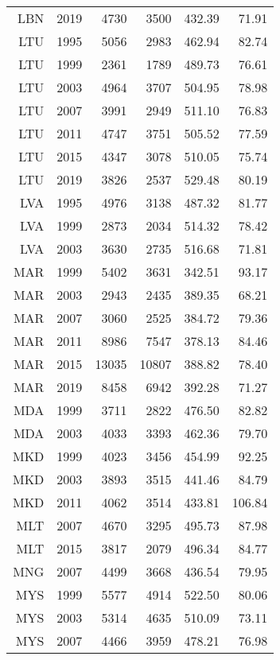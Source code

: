 \begin{longtable}{|r|r|r|r|r|r|}
    LBN   & 2019  & 4730  & 3500  & 432.39 & 71.91 \\
    LTU   & 1995  & 5056  & 2983  & 462.94 & 82.74 \\
    LTU   & 1999  & 2361  & 1789  & 489.73 & 76.61 \\
    LTU   & 2003  & 4964  & 3707  & 504.95 & 78.98 \\
    LTU   & 2007  & 3991  & 2949  & 511.10 & 76.83 \\
    LTU   & 2011  & 4747  & 3751  & 505.52 & 77.59 \\
    LTU   & 2015  & 4347  & 3078  & 510.05 & 75.74 \\
    LTU   & 2019  & 3826  & 2537  & 529.48 & 80.19 \\
    LVA   & 1995  & 4976  & 3138  & 487.32 & 81.77 \\
    LVA   & 1999  & 2873  & 2034  & 514.32 & 78.42 \\
    LVA   & 2003  & 3630  & 2735  & 516.68 & 71.81 \\
    MAR   & 1999  & 5402  & 3631  & 342.51 & 93.17 \\
    MAR   & 2003  & 2943  & 2435  & 389.35 & 68.21 \\
    MAR   & 2007  & 3060  & 2525  & 384.72 & 79.36 \\
    MAR   & 2011  & 8986  & 7547  & 378.13 & 84.46 \\
    MAR   & 2015  & 13035 & 10807 & 388.82 & 78.40 \\
    MAR   & 2019  & 8458  & 6942  & 392.28 & 71.27 \\
    MDA   & 1999  & 3711  & 2822  & 476.50 & 82.82 \\
    MDA   & 2003  & 4033  & 3393  & 462.36 & 79.70 \\
    MKD   & 1999  & 4023  & 3456  & 454.99 & 92.25 \\
    MKD   & 2003  & 3893  & 3515  & 441.46 & 84.79 \\
    MKD   & 2011  & 4062  & 3514  & 433.81 & 106.84 \\
    MLT   & 2007  & 4670  & 3295  & 495.73 & 87.98 \\
    MLT   & 2015  & 3817  & 2079  & 496.34 & 84.77 \\
    MNG   & 2007  & 4499  & 3668  & 436.54 & 79.95 \\
    MYS   & 1999  & 5577  & 4914  & 522.50 & 80.06 \\
    MYS   & 2003  & 5314  & 4635  & 510.09 & 73.11 \\
    MYS   & 2007  & 4466  & 3959  & 478.21 & 76.98 \\

\end{longtable}
